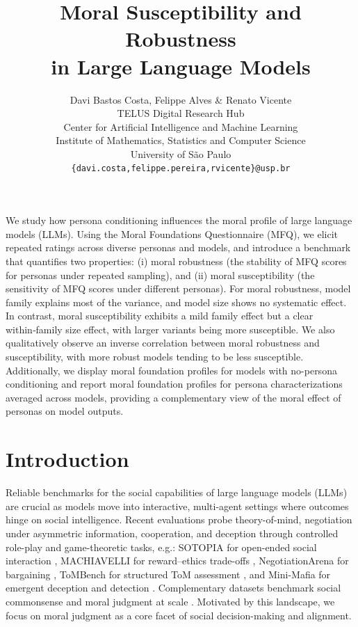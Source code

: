 \documentclass{article}
\title{Moral Susceptibility and Robustness\\ in Large Language Models}
\author{Davi Bastos Costa, Felippe Alves \& Renato Vicente \\
TELUS Digital Research Hub\\ 
Center for Artificial Intelligence and Machine Learning\\
Institute of Mathematics, Statistics and Computer Science\\
University of São Paulo \\
\texttt{\{davi.costa,felippe.pereira,rvicente\}@usp.br} \\
}
\begin{document}
\maketitle

\begin{abstract}
\end{abstract}
We study how persona conditioning influences the moral profile of large language models (LLMs). Using the Moral Foundations Questionnaire (MFQ), we elicit repeated ratings across diverse personas and models, and introduce a benchmark that quantifies two properties: (i) moral robustness (the stability of MFQ scores for personas under repeated sampling), and (ii) moral susceptibility (the sensitivity of MFQ scores under different personas). For moral robustness, model family explains most of the variance, and model size shows no systematic effect. In contrast, moral susceptibility exhibits a mild family effect but a clear within‑family size effect, with larger variants being more susceptible. We also qualitatively observe an inverse correlation between moral robustness and susceptibility, with more robust models tending to be less susceptible. Additionally, we display moral foundation profiles for models with no-persona conditioning and report moral foundation profiles for persona characterizations averaged across models, providing a complementary view of the moral effect of personas on model outputs.

\section{Introduction}
Reliable benchmarks for the social capabilities of large language models (LLMs) are crucial as models move into interactive, multi-agent settings where outcomes hinge on social intelligence. Recent evaluations probe theory-of-mind, negotiation under asymmetric information, cooperation, and deception through controlled role-play and game-theoretic tasks, e.g.: SOTOPIA for open-ended social interaction \cite{zhou2024sotopia}, MACHIAVELLI for reward–ethics trade-offs \cite{pan2023machiavelli}, NegotiationArena for bargaining \cite{bianchi2024negotiationarena}, ToMBench for structured ToM assessment \cite{chen-etal-2024-tombench}, and Mini-Mafia for emergent deception and detection \cite{costa2025deceivedetectdiscloselarge}. Complementary datasets benchmark social commonsense and moral judgment at scale \cite{sap-etal-2019-social,hendrycks2021ethics}. Motivated by this landscape, we focus on moral judgment as a core facet of social decision-making and alignment.
\end{document}
